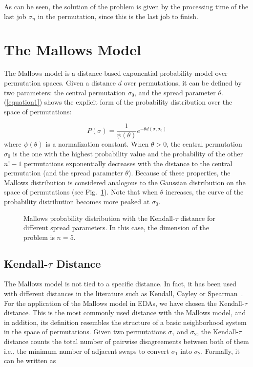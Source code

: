 \documentclass[runningheads]{llncs}
\begin{document}
As can be seen, the solution of the problem is given by the processing time of the last job $\sigma_n$ in the permutation, since this is the last job to finish.

\section{The Mallows Model}

The Mallows model \cite{mallows} is a distance-based exponential probability model over permutation spaces. Given a distance $d$ over permutations, it can be defined by two parameters: the central permutation $\sigma_0$, and the spread parameter $\theta$. (\ref{equation1}) shows the explicit form of the probability distribution over the space of permutations:

\begin{equation}
P(\sigma)= \frac{1}{\psi(\theta)}e^{-\theta d (\sigma, \sigma_0)}
\label{equation1}
\end{equation}
%
where $\psi(\theta)$ is a normalization constant. When $\theta>0$, the central permutation $\sigma_0$ is the one with the highest probability value and the probability of the other $n!-1$ permutations exponentially decreases with the distance to the central permutation (and the spread parameter $\theta$). Because of these properties, the Mallows distribution is considered analogous to the Gaussian distribution on the space of permutations (see Fig.~\ref{F:MallowsPD}). Note that when $\theta$ increases, the curve of the probability distribution becomes more peaked at $\sigma_0$.
\vspace{-0.5cm}
\begin{figure}
\centering
{}
\caption{Mallows probability distribution with the Kendall-$\tau$ distance for different spread parameters. In this case, the dimension of the problem is $n=5$.}
\label{F:MallowsPD}
\end{figure}
\vspace{-0.5cm}

\subsection{Kendall-$\tau$ Distance}
The Mallows model is not tied to a specific distance. In fact, it has been used with different distances in the literature such as Kendall, Cayley or Spearman~\cite{gmallows}. For the application of the Mallows model in EDAs, we have chosen the Kendall-$\tau$ distance. This is the most commonly used distance with the Mallows model, and in addition, its definition resembles the structure of a basic neighborhood system in the space of permutations. Given two permutations $\sigma_1$ and $\sigma_2$, the Kendall-$\tau$ distance counts the total number of pairwise disagreements between both of them i.e., the minimum number of adjacent swaps to convert $\sigma_1$ into $\sigma_2$. 
Formally, it can be written as 
\end{document}
